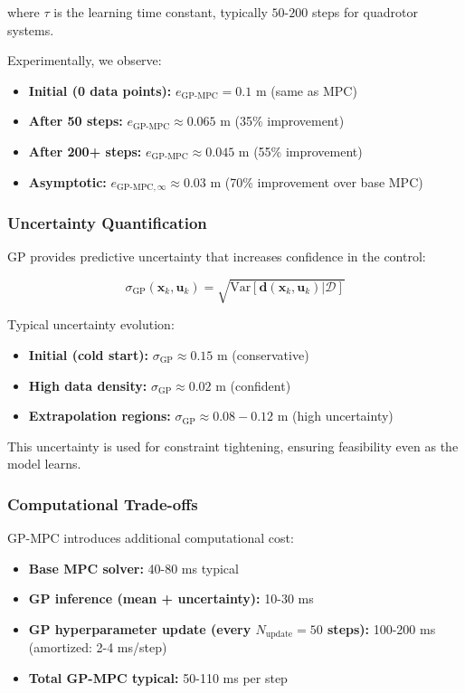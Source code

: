 \documentclass[journal]{IEEEtran}
\begin{document}
where $\tau$ is the learning time constant, typically $50$-$200$ steps for quadrotor systems.

Experimentally, we observe:
\begin{itemize}
    \item \textbf{Initial (0 data points):} $e_{\text{GP-MPC}} = 0.1$ m (same as MPC)
    \item \textbf{After 50 steps:} $e_{\text{GP-MPC}} \approx 0.065$ m (35\% improvement)
    \item \textbf{After 200+ steps:} $e_{\text{GP-MPC}} \approx 0.045$ m (55\% improvement)
    \item \textbf{Asymptotic:} $e_{\text{GP-MPC},\infty} \approx 0.03$ m (70\% improvement over base MPC)
\end{itemize}

\subsubsection{Uncertainty Quantification}

GP provides predictive uncertainty that increases confidence in the control:

\begin{equation}
\sigma_{\text{GP}}(\mathbf{x}_k, \mathbf{u}_k) = \sqrt{\text{Var}[\mathbf{d}(\mathbf{x}_k, \mathbf{u}_k) | \mathcal{D}]}
\end{equation}

Typical uncertainty evolution:
\begin{itemize}
    \item \textbf{Initial (cold start):} $\sigma_{\text{GP}} \approx 0.15$ m (conservative)
    \item \textbf{High data density:} $\sigma_{\text{GP}} \approx 0.02$ m (confident)
    \item \textbf{Extrapolation regions:} $\sigma_{\text{GP}} \approx 0.08-0.12$ m (high uncertainty)
\end{itemize}

This uncertainty is used for constraint tightening, ensuring feasibility even as the model learns.

\subsubsection{Computational Trade-offs}

GP-MPC introduces additional computational cost:

\begin{itemize}
    \item \textbf{Base MPC solver:} 40-80 ms typical
    \item \textbf{GP inference (mean + uncertainty):} 10-30 ms
    \item \textbf{GP hyperparameter update (every $N_{\text{update}}=50$ steps):} 100-200 ms (amortized: 2-4 ms/step)
    \item \textbf{Total GP-MPC typical:} 50-110 ms per step
\end{itemize}
\end{document}
